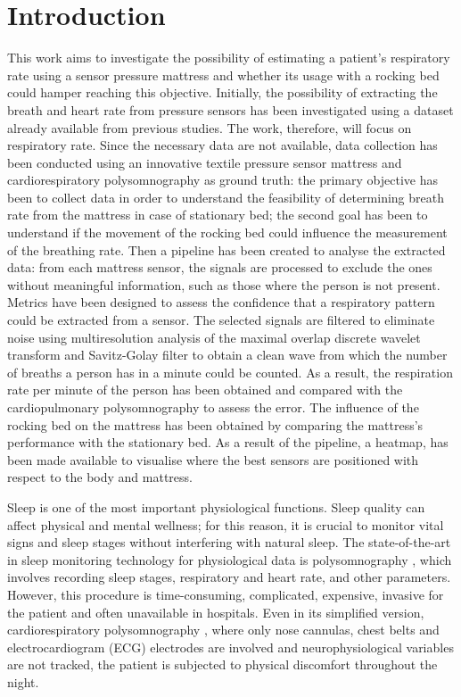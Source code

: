 
\chapter{Introduction}


This work aims to investigate the possibility of estimating a patient's respiratory rate using a sensor pressure mattress and whether its usage with a rocking bed could hamper reaching this objective. 
Initially, the possibility of extracting the breath and heart rate from pressure sensors has been investigated using a dataset already available from previous studies. The work, therefore, will focus on respiratory rate. Since the necessary data are not available, data collection has been conducted using an innovative textile pressure sensor mattress and cardiorespiratory polysomnography as ground truth: the primary objective has been to collect data in order to understand the feasibility of determining breath rate from the mattress in case of stationary bed; the second goal has been to understand if the movement of the rocking bed could influence the measurement of the breathing rate. 
Then a pipeline has been created to analyse the extracted data: from each mattress sensor, the signals are processed to exclude the ones without meaningful information, such as those where the person is not present. Metrics have been designed to assess the confidence that a respiratory pattern could be extracted from a sensor. The selected signals are filtered to eliminate noise using multiresolution analysis of the maximal overlap discrete wavelet transform and Savitz-Golay filter to obtain a clean wave from which the number of breaths a person has in a minute could be counted. As a result, the respiration rate per minute of the person has been obtained and compared with the cardiopulmonary polysomnography to assess the error. The influence of the rocking bed on the mattress has been obtained by comparing the mattress's performance with the stationary bed. As a result of the pipeline, a heatmap, has been made available to visualise where the best sensors are positioned with respect to the body and mattress. \newline

Sleep is one of the most important physiological functions. Sleep quality can affect physical and mental wellness; for this reason, it is crucial to monitor vital signs and sleep stages without interfering with natural sleep. 
The state-of-the-art in sleep monitoring technology for physiological data is polysomnography \cite{Penzel2016ModulationsPolysomnography}, which involves recording sleep stages, respiratory and heart rate, and other parameters. However, this procedure is time-consuming, complicated, expensive, invasive for the patient and often unavailable in hospitals. Even in its simplified version, cardiorespiratory polysomnography \cite{CallejaComparisonApnoea}, where only nose cannulas, chest belts and electrocardiogram (ECG) electrodes are involved and neurophysiological variables are not tracked, the patient is subjected to physical discomfort throughout the night.

